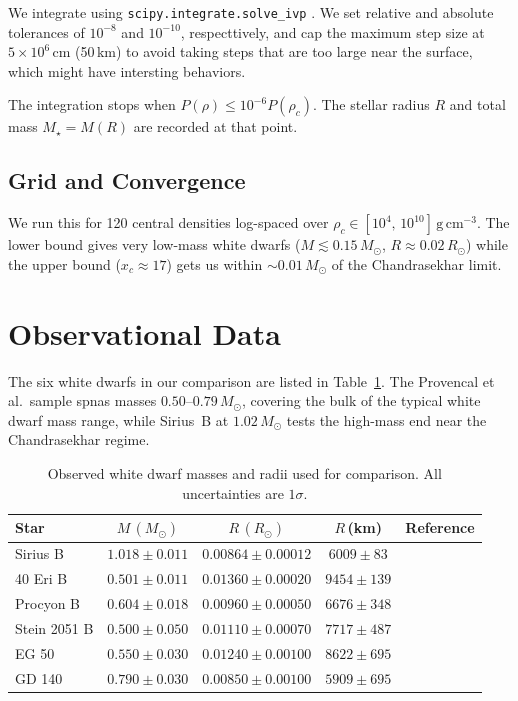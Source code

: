 \documentclass[12pt,letterpaper]{article}
\begin{document}
We integrate using \texttt{scipy.integrate.solve\_ivp}
\citep{dormand1980} \citep{virtanen2020}.
We set relative and absolute tolerances of $10^{-8}$ and $10^{-10}$, respecttively, and cap the
maximum step size at $5 \times 10^6$\,cm (50\,km) to avoid taking steps that are
too large near the surface, which might have intersting behaviors.

The integration stops when $P(\rho) \leq 10^{-6} P(\rho_c)$. 
The stellar radius $R$ and total mass $M_\star = M(R)$ are recorded at that point.

\subsection{Grid and Convergence}

We run this for 120 central densities log-spaced over
$\rho_c \in [10^4,\,10^{10}]\,\mathrm{g\,cm^{-3}}$.
The lower bound gives very low-mass white dwarfs ($M \lesssim 0.15\,M_\odot$,
$R \approx 0.02\,R_\odot$) while the upper bound ($x_c \approx 17$) gets us within
$\sim 0.01\,M_\odot$ of the Chandrasekhar limit.

\section{Observational Data}
\label{sec:data}
The six white dwarfs in our comparison are listed in Table~\ref{tab:obs}.
The Provencal et al.\ sample spnas masses $0.50$--$0.79\,M_\odot$, covering the
bulk of the typical white dwarf mass range, while Sirius~B at $1.02\,M_\odot$
tests the high-mass end near the Chandrasekhar regime.

\begin{table}[htbp]
  \centering
  \caption{Observed white dwarf masses and radii used for comparison.
           All uncertainties are $1\sigma$.}
  \label{tab:obs}
  \begin{tabular}{lcccl}
    \toprule
    Star & $M\,(M_\odot)$ & $R\,(R_\odot)$ & $R$\,(km) & Reference \\
    \midrule
    Sirius B      & $1.018 \pm 0.011$ & $0.00864 \pm 0.00012$ & $6009 \pm 83$  & \citet{barstow2005}   \\
    40 Eri B      & $0.501 \pm 0.011$ & $0.01360 \pm 0.00020$ & $9454 \pm 139$ & \citet{provencal1998} \\
    Procyon B     & $0.604 \pm 0.018$ & $0.00960 \pm 0.00050$ & $6676 \pm 348$ & \citet{provencal1998} \\
    Stein 2051 B  & $0.500 \pm 0.050$ & $0.01110 \pm 0.00070$ & $7717 \pm 487$ & \citet{provencal1998} \\
    EG 50         & $0.550 \pm 0.030$ & $0.01240 \pm 0.00100$ & $8622 \pm 695$ & \citet{provencal1998} \\
    GD 140        & $0.790 \pm 0.030$ & $0.00850 \pm 0.00100$ & $5909 \pm 695$ & \citet{provencal1998} \\
    \bottomrule
  \end{tabular}
\end{table}
\end{document}
